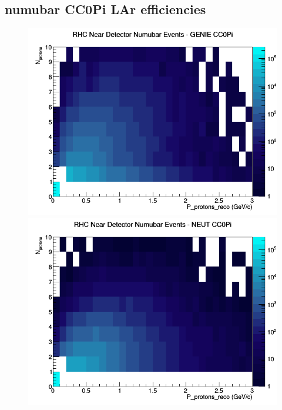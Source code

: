 \documentclass[12pt]{article}
\begin{document}
\subsection{numubar CC0Pi LAr efficiencies}
\begin{figure}[h]
\includegraphics[width=\linewidth]{eff_N_P/LAr/protons/CC0Pi_RHC_ND_numubar_N_P_GENIE.png}
\endminipage
{}
\includegraphics[width=\linewidth]{eff_N_P/LAr/protons/CC0Pi_RHC_ND_numubar_N_P_NEUT.png}
\endminipage
{}

\end{figure}
\end{document}
